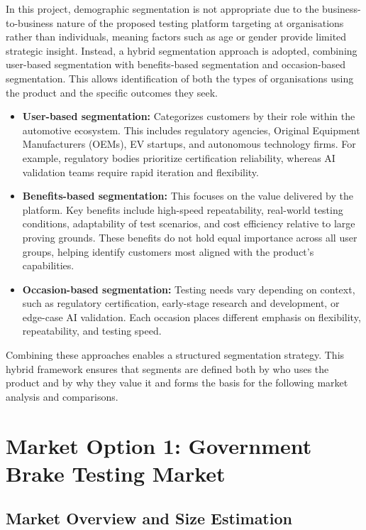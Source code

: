 In this project, demographic segmentation is not appropriate due to the business-to-business nature of the proposed testing platform targeting at organisations rather than individuals, meaning factors such as age or gender provide limited strategic insight. Instead, a hybrid segmentation approach is adopted, combining user-based segmentation with benefits-based segmentation and occasion-based segmentation. This allows identification of both the types of organisations using the product and the specific outcomes they seek. 

\begin{itemize}
    \item \textbf{User-based segmentation:} Categorizes customers by their role within the automotive ecosystem. This includes regulatory agencies, Original Equipment Manufacturers (OEMs), EV startups, and autonomous technology firms. For example, regulatory bodies prioritize certification reliability, whereas AI validation teams require rapid iteration and flexibility.
    
    \item \textbf{Benefits-based segmentation:} This focuses on the value delivered by the platform. Key benefits include high-speed repeatability, real-world testing conditions, adaptability of test scenarios, and cost efficiency relative to large proving grounds. These benefits do not hold equal importance across all user groups, helping identify customers most aligned with the product’s capabilities.
    
    \item \textbf{Occasion-based segmentation:} Testing needs vary depending on context, such as regulatory certification, early-stage research and development, or edge-case AI validation. Each occasion places different emphasis on flexibility, repeatability, and testing speed.
\end{itemize}

Combining these approaches enables a structured segmentation strategy. This hybrid framework ensures that segments are defined both by who uses the product and by why they value it and forms the basis for the following market analysis and comparisons. 

\section{Market Option 1: Government Brake Testing Market}

\subsection{Market Overview and Size Estimation} 

